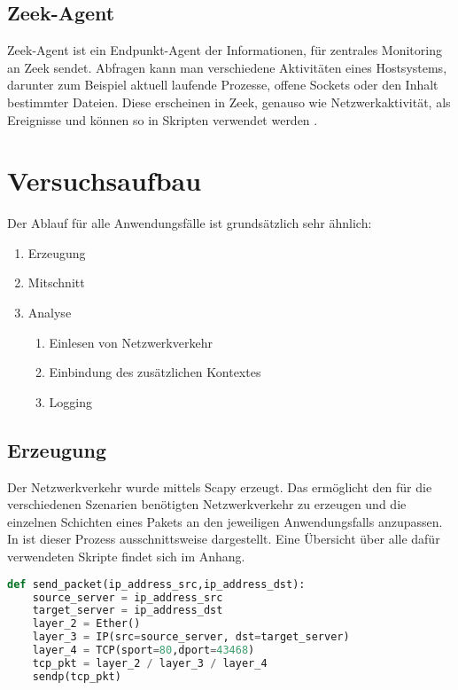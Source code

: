 \subsection{Zeek-Agent}
Zeek-Agent ist ein Endpunkt-Agent der Informationen, für zentrales Monitoring an Zeek sendet.
Abfragen kann man verschiedene Aktivitäten eines Hostsystems, darunter zum Beispiel aktuell laufende Prozesse, offene Sockets oder den Inhalt bestimmter Dateien. Diese erscheinen in Zeek, genauso wie Netzwerkaktivität, als Ereignisse und können so in Skripten verwendet werden \cite{zeek_agent}.

\section{Versuchsaufbau}
Der Ablauf für alle Anwendungsfälle ist grundsätzlich sehr ähnlich:
\begin{enumerate}
\item{Erzeugung}
\item{Mitschnitt}
\item{Analyse}
\begin{enumerate}
\item{Einlesen von Netzwerkverkehr}
\item{Einbindung des zusätzlichen Kontextes}
\item{Logging}
\end{enumerate}
\end{enumerate}
\subsection{Erzeugung}
Der Netzwerkverkehr wurde mittels Scapy erzeugt. Das ermöglicht den für die verschiedenen Szenarien benötigten Netzwerkverkehr zu erzeugen und die einzelnen Schichten eines Pakets an den jeweiligen Anwendungsfalls anzupassen. In ist dieser Prozess ausschnittsweise dargestellt. Eine Übersicht über alle dafür verwendeten Skripte findet sich im Anhang.
\begin{lstlisting}[language=python,caption={Konfiguration und Versendung eines Pakets},firstnumber=6]
def send_packet(ip_address_src,ip_address_dst):
    source_server = ip_address_src
    target_server = ip_address_dst
    layer_2 = Ether()
    layer_3 = IP(src=source_server, dst=target_server)
    layer_4 = TCP(sport=80,dport=43468)
    tcp_pkt = layer_2 / layer_3 / layer_4
    sendp(tcp_pkt)
\end{lstlisting}
